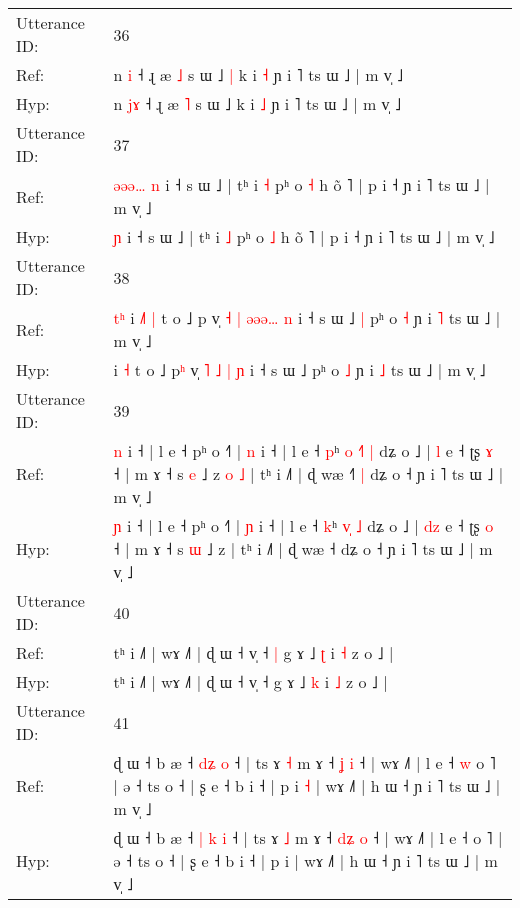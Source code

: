 \documentclass[10pt]{article}
\DeclareRobustCommand{\hl}[1]{{\textcolor{red}{#1}}}
\begin{document}
\begin{longtable}{ll}
 \\
\midrule
Utterance ID: & 36 \\
Ref: & n \hl{}\hl{i} ˧ ɻ æ \hl{˩} s ɯ ˩\hl{ }\hl{|} k i \hl{˧} ɲ i ˥ ts ɯ ˩ | m v̩ ˩
 \\
Hyp: & n \hl{j}\hl{ɤ} ˧ ɻ æ \hl{˥} s ɯ ˩\hl{}\hl{} k i \hl{˩} ɲ i ˥ ts ɯ ˩ | m v̩ ˩
 \\
\midrule
Utterance ID: & 37 \\
Ref: & \hl{ə}\hl{ə}\hl{ə}\hl{…}\hl{ }\hl{n} i ˧ s ɯ ˩ | tʰ i \hl{˧} pʰ o \hl{˧} h õ ˥ | p i ˧ ɲ i ˥ ts ɯ ˩ | m v̩ ˩
 \\
Hyp: & \hl{}\hl{}\hl{}\hl{}\hl{}\hl{ɲ} i ˧ s ɯ ˩ | tʰ i \hl{˩} pʰ o \hl{˩} h õ ˥ | p i ˧ ɲ i ˥ ts ɯ ˩ | m v̩ ˩
 \\
\midrule
Utterance ID: & 38 \\
Ref: & \hl{t}\hl{ʰ}\hl{ }i\hl{ }\hl{˩}\hl{˥} \hl{|} t o ˩ p\hl{} v̩ \hl{˧} \hl{|} \hl{ə}\hl{ə}\hl{ə}\hl{…} \hl{n} i ˧ s ɯ ˩\hl{ }\hl{|} pʰ o \hl{˧} ɲ i \hl{˥} ts ɯ ˩ | m v̩ ˩
 \\
Hyp: & \hl{}\hl{}\hl{}i\hl{}\hl{}\hl{} \hl{˧} t o ˩ p\hl{ʰ} v̩ \hl{˥} \hl{˩} \hl{}\hl{}\hl{}\hl{|} \hl{ɲ} i ˧ s ɯ ˩\hl{}\hl{} pʰ o \hl{˩} ɲ i \hl{˩} ts ɯ ˩ | m v̩ ˩
 \\
\midrule
Utterance ID: & 39 \\
Ref: & \hl{n} i ˧ | l e ˧ pʰ o ˧˥ | \hl{n} i ˧ | l e ˧ \hl{p}ʰ\hl{ }\hl{o} \hl{˧}\hl{˥} \hl{|} dʑ o ˩ | \hl{}\hl{l} e ˧ ʈʂ \hl{ɤ} ˧ | m ɤ ˧ s \hl{e} ˩ z\hl{ }\hl{o}\hl{ }\hl{˩} | tʰ i ˩˥ | ɖ wæ ˧\hl{˥}\hl{ }\hl{|} dʑ o ˧ ɲ i ˥ ts ɯ ˩ | m v̩ ˩
 \\
Hyp: & \hl{ɲ} i ˧ | l e ˧ pʰ o ˧˥ | \hl{ɲ} i ˧ | l e ˧ \hl{k}ʰ\hl{}\hl{} \hl{v}\hl{̩} \hl{˩} dʑ o ˩ | \hl{d}\hl{z} e ˧ ʈʂ \hl{o} ˧ | m ɤ ˧ s \hl{ɯ} ˩ z\hl{}\hl{}\hl{}\hl{} | tʰ i ˩˥ | ɖ wæ ˧\hl{}\hl{}\hl{} dʑ o ˧ ɲ i ˥ ts ɯ ˩ | m v̩ ˩
 \\
\midrule
Utterance ID: & 40 \\
Ref: & tʰ i ˩˥ | wɤ ˩˥ | ɖ ɯ ˧ v̩ ˧\hl{ }\hl{|} g ɤ ˩ \hl{ʈ} i \hl{˧} z o ˩ |
 \\
Hyp: & tʰ i ˩˥ | wɤ ˩˥ | ɖ ɯ ˧ v̩ ˧\hl{}\hl{} g ɤ ˩ \hl{k} i \hl{˩} z o ˩ |
 \\
\midrule
Utterance ID: & 41 \\
Ref: & ɖ ɯ ˧ b æ ˧ \hl{}\hl{d}\hl{ʑ} \hl{o} ˧ | ts ɤ \hl{˧} m ɤ ˧ \hl{}\hl{ʝ} \hl{i} ˧ | wɤ ˩˥ | l e ˧\hl{ }\hl{w} o ˥ | ə ˧ ts o ˧ | ʂ e ˧ b i ˧ | p i\hl{ }\hl{˧} | wɤ ˩˥ | h ɯ ˧ ɲ i ˥ ts ɯ ˩ | m v̩ ˩
 \\
Hyp: & ɖ ɯ ˧ b æ ˧ \hl{|}\hl{ }\hl{k} \hl{i} ˧ | ts ɤ \hl{˩} m ɤ ˧ \hl{d}\hl{ʑ} \hl{o} ˧ | wɤ ˩˥ | l e ˧\hl{}\hl{} o ˥ | ə ˧ ts o ˧ | ʂ e ˧ b i ˧ | p i\hl{}\hl{} | wɤ ˩˥ | h ɯ ˧ ɲ i ˥ ts ɯ ˩ | m v̩ ˩

\end{longtable}
\end{document}
